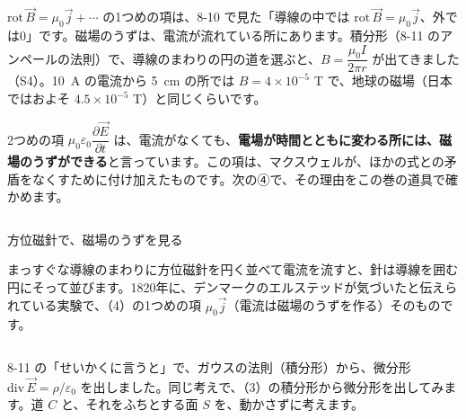 $\mathrm{rot}\,\vec B=\mu_0\vec j+\cdots$ の1つめの項は、8-10 で見た「導線の中では $\mathrm{rot}\,\vec B=\mu_0\vec j$、外では0」です。磁場のうずは、電流が流れている所にあります。積分形（8-11 のアンペールの法則）で、導線のまわりの円の道を選ぶと、$B=\dfrac{\mu_0I}{2\pi r}$ が出てきました（S4）。\qty{10}{A} の電流から \qty{5}{cm} の所では $B=4\times10^{-5}$ T で、地球の磁場（日本ではおよそ $4.5\times10^{-5}$ T）と同じくらいです。

2つめの項 $\mu_0\varepsilon_0\dfrac{\partial\vec E}{\partial t}$ は、電流がなくても、\textbf{電場が時間とともに変わる所には、磁場のうずができる}と言っています。この項は、マクスウェルが、ほかの式との矛盾をなくすために付け加えたものです。次の④で、その理由をこの巻の道具で確かめます。

\begin{column}{方位磁針で、磁場のうずを見る}
\noindent\begin{minipage}[c]{0.6\linewidth}\raggedright
まっすぐな導線のまわりに方位磁針を円く並べて電流を流すと、針は導線を囲む円にそって並びます。1820年に、デンマークのエルステッドが気づいたと伝えられている実験で、（4）の1つめの項 $\mu_0\vec j$（電流は磁場のうずを作る）そのものです。
\end{minipage}\hfill
\begin{minipage}[c]{0.36\linewidth}\centering
{}
\end{minipage}
\end{column}


\label{bk:8-14:sekibun}8-11 の「せいかくに言うと」で、ガウスの法則（積分形）から、微分形 $\mathrm{div}\,\vec E=\rho/\varepsilon_0$ を出しました。同じ考えで、（3）の積分形から微分形を出してみます。道 $C$ と、それをふちとする面 $S$ を、動かさずに考えます。


